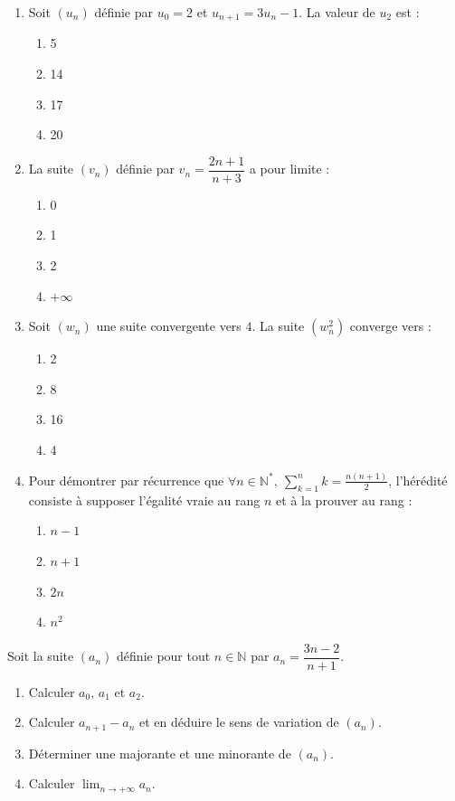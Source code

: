 \documentclass[11pt]{article}
\begin{document}
\begin{exercice}
\begin{enumerate}
    \item Soit $(u_n)$ définie par $u_0 = 2$ et $u_{n+1} = 3u_n - 1$. La valeur de $u_2$ est :
    \begin{enumerate}
        \item 5 \item 14 \item 17 \item 20
    \end{enumerate}
    \item La suite $(v_n)$ définie par $v_n = \dfrac{2n+1}{n+3}$ a pour limite :
    \begin{enumerate}
        \item 0 \item 1 \item 2 \item $+\infty$
    \end{enumerate}
    \item Soit $(w_n)$ une suite convergente vers $4$. La suite $(w_n^2)$ converge vers :
    \begin{enumerate}
        \item 2 \item 8 \item 16 \item 4
    \end{enumerate}
    \item Pour démontrer par récurrence que $\forall n \in \mathbb{N}^*,\ \sum_{k=1}^n k = \frac{n(n+1)}{2}$, l'hérédité consiste à supposer l'égalité vraie au rang $n$ et à la prouver au rang :
    \begin{enumerate}
        \item $n-1$ \item $n+1$ \item $2n$ \item $n^2$
    \end{enumerate}
\end{enumerate}
\end{exercice}

\begin{exercice}
Soit la suite $(a_n)$ définie pour tout $n \in \mathbb{N}$ par $a_n = \dfrac{3n-2}{n+1}$.
\begin{enumerate}
    \item Calculer $a_0$, $a_1$ et $a_2$.
    \item Calculer $a_{n+1} - a_n$ et en déduire le sens de variation de $(a_n)$.
    \item Déterminer une majorante et une minorante de $(a_n)$.
    \item Calculer $\lim_{n\to+\infty} a_n$.
\end{enumerate}
\end{exercice}
\end{document}

